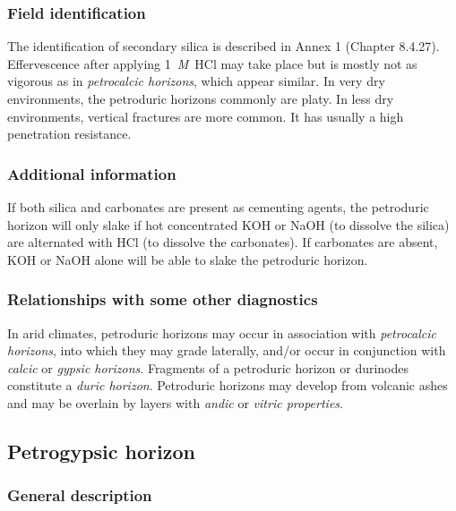 \documentclass[
  letterpaper,
  DIV=11,
  numbers=noendperiod]{scrreprt}
\begin{document}
\hypertarget{field-identification-18}{%
\subsubsection{Field identification}\label{field-identification-18}}

The identification of secondary silica is described in Annex 1 (Chapter
8.4.27). Effervescence after applying 1~\emph{M}~HCl may take place but
is mostly not as vigorous as in \emph{petrocalcic horizons}, which
appear similar. In very dry environments, the petroduric horizons
commonly are platy. In less dry environments, vertical fractures are
more common. It has usually a high penetration resistance.

\hypertarget{additional-information-12}{%
\subsubsection{Additional information}\label{additional-information-12}}

If both silica and carbonates are present as cementing agents, the
petroduric horizon will only slake if hot concentrated KOH or NaOH (to
dissolve the silica) are alternated with HCl (to dissolve the
carbonates). If carbonates are absent, KOH or NaOH alone will be able to
slake the petroduric horizon.

\hypertarget{relationships-with-some-other-diagnostics-24}{%
\subsubsection{Relationships with some other
diagnostics}\label{relationships-with-some-other-diagnostics-24}}

In arid climates, petroduric horizons may occur in association with
\emph{petrocalcic horizons}, into which they may grade laterally, and/or
occur in conjunction with \emph{calcic} or \emph{gypsic horizons}.
Fragments of a petroduric horizon or durinodes constitute a \emph{duric
horizon}. Petroduric horizons may develop from volcanic ashes and may be
overlain by layers with \emph{andic} or \emph{vitric properties}.

\hypertarget{petrogypsic-horizon}{%
\subsection{Petrogypsic horizon}\label{petrogypsic-horizon}}

\hypertarget{general-description-25}{%
\subsubsection{General description}\label{general-description-25}}
\end{document}
